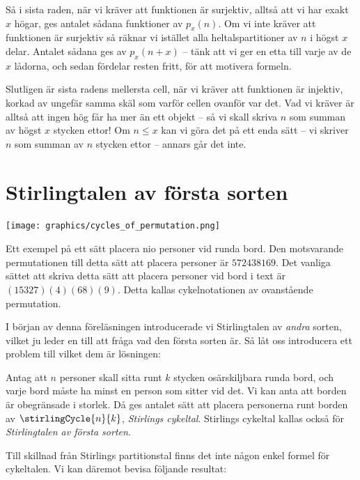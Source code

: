 \documentclass[nobib]{tufte-handout}
\begin{document}
Så i sista raden, när vi kräver att funktionen är surjektiv, alltså att vi har exakt $x$ högar, ges antalet sådana funktioner av $p_x(n)$. Om vi inte kräver att funktionen är surjektiv så räknar vi istället alla heltalspartitioner av $n$ i högst $x$ delar. Antalet sådana ges av $p_x(n+x)$ -- tänk att vi ger en etta till varje av de $x$ lådorna, och sedan fördelar resten fritt, för att motivera formeln.

Slutligen är sista radens mellersta cell, när vi kräver att funktionen är injektiv, korkad av ungefär samma skäl som varför cellen ovanför var det. Vad vi kräver är alltså att ingen hög får ha mer än ett objekt -- så vi skall skriva $n$ som summan av högst $x$ stycken ettor! Om $n \leq x$ kan vi göra det på ett enda sätt -- vi skriver $n$ som summan av $n$ stycken ettor -- annars går det inte.

\section{Stirlingtalen av första sorten}

\begin{marginfigure}\label{fig_cycles_of_permutation}
      \texttt{[image: graphics/cycles\_of\_permutation.png]}
      \caption{Ett exempel på ett sätt placera nio personer vid runda bord. Den motsvarande permutationen till detta sätt att placera personer är $572438169$. Det vanliga sättet att skriva detta sätt att placera personer vid bord i text är $(15327)(4)(68)(9)$. Detta kallas cykelnotationen av ovanstående permutation.}
    \end{marginfigure}


I början av denna föreläsningen introducerade vi Stirlingtalen av \emph{andra} sorten, vilket ju leder en till att fråga vad den första sorten är. Så låt oss introducera ett problem till vilket dem är lösningen:

\begin{definition}
  Antag att $n$ personer skall sitta runt $k$ stycken osärskiljbara runda bord, och varje bord måste ha minst en person som sitter vid det. Vi kan anta att borden är obegränsade i storlek. Då ges antalet sätt att placera personerna runt borden av $\stirlingCycle{n}{k}$, \emph{Stirlings cykeltal}. Stirlings cykeltal kallas också för \emph{Stirlingtalen av första sorten}.
\end{definition}

Till skillnad från Stirlings partitionstal finns det inte någon enkel formel för cykeltalen. Vi kan däremot bevisa följande resultat:
\end{document}
